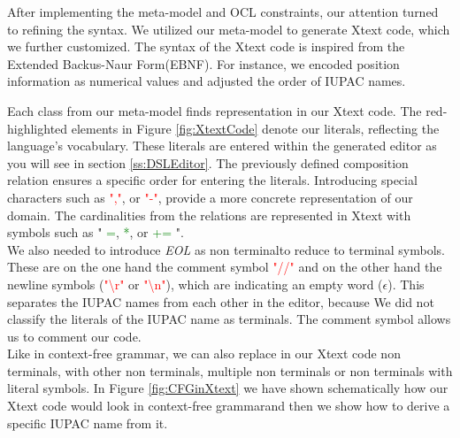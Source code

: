 \documentclass[
fontsize=11pt,
paper=a4,
abstract=true,
numbers=noenddot,
listof=totoc,
bibliography=totoc,
twoside,
open=right,
cleardoublepage=plain,
parskip=half+, %
BCOR=1cm, %
]{scrreprt}
\newcommand{\CFG}{context-free grammar}
\newcommand{\ENBF}{Extended Backus-Naur Form}
\newcommand{\nonterminal}{non terminal}
\begin{document}
After implementing the meta-model and OCL constraints, our attention turned to refining the syntax. We utilized our meta-model to generate Xtext code, which we further customized. The syntax of the Xtext code is inspired from the \ENBF (EBNF). For instance, we encoded position information as numerical values and adjusted the order of IUPAC names.

Each class from our meta-model finds representation in our Xtext code. The red-highlighted elements in Figure \ref{fig:XtextCode} denote our literals, reflecting the language's vocabulary. These literals are entered within the generated editor as you will see in section \ref{ss:DSLEditor}. The previously defined composition relation ensures a specific order for entering the literals. Introducing special characters such as \textcolor{red}{","}, or \textcolor{red}{"-"}, provide a more concrete representation of our domain. The cardinalities from the relations are represented in Xtext with symbols such as " \textcolor{green}{=}, \textcolor{green}{*}, or \textcolor{green}{+=} ". \\

We also needed to introduce \emph{EOL} as \nonterminal\space to reduce to terminal symbols. These are on the one hand the comment symbol \textcolor{red}{"//"} and on the other hand the newline symbols (\textcolor{red}{"\textbackslash r"} or \textcolor{red}{"\textbackslash n"}), which are indicating an empty word ($\epsilon$). This separates the IUPAC names from each other in the editor, because We did not classify the literals of the IUPAC name as terminals. The comment symbol allows us to comment our code.\\

Like in \CFG\space, we can also replace in our Xtext code \nonterminal s, with other \nonterminal s, multiple \nonterminal s or \nonterminal s with literal symbols. In Figure \ref{fig:CFGinXtext} we have shown schematically how our Xtext code would look in \CFG\space and then we show how to derive a specific IUPAC name from it.\\

\end{document}

